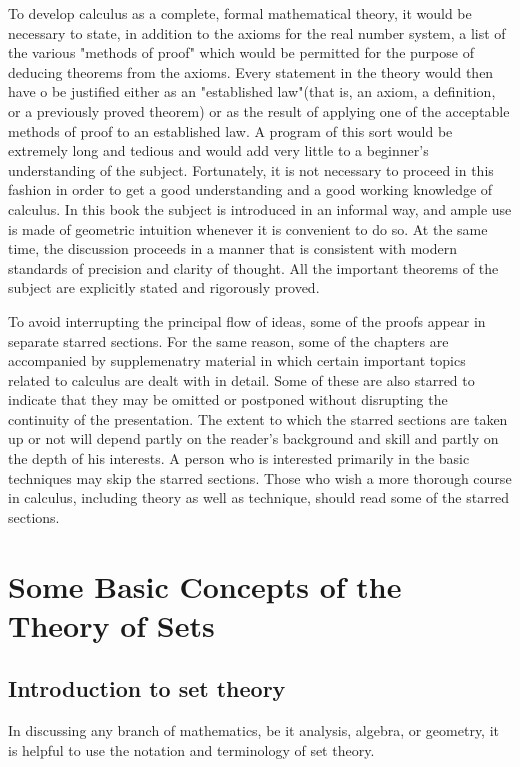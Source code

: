 \documentclass[cn,11pt,chinese]{elegantbook}
\numberwithin{equation}{section}
\begin{document}
To develop calculus as a complete, formal mathematical theory, it would be necessary to state, in addition to the axioms for the real number system, a list of the various "methods of proof" which would be permitted for the purpose of deducing theorems from the axioms. Every statement in the theory would then have o be justified either as an "established law"(that is, an axiom, a definition, or a previously proved theorem) or as the result of applying one of the acceptable methods of proof to an established law. A program of this sort would be extremely long and tedious and would add very little to a beginner's understanding of the subject. Fortunately, it is not necessary to proceed in this fashion in order to get a good understanding and a good working knowledge of calculus. In this book the subject is introduced in an informal way, and ample use is made of geometric intuition whenever it is convenient to do so. At the same time, the discussion proceeds in a manner that is consistent with modern standards of precision and clarity of thought. All the important theorems of the subject are explicitly stated and rigorously proved.

To avoid interrupting the principal flow of ideas, some of the proofs appear in separate starred sections. For the same reason, some of the chapters are accompanied by supplemenatry material in which certain important topics related to calculus are dealt with in detail. Some of these are also starred to indicate that they may be omitted or postponed without disrupting the continuity of the presentation. The extent to which the starred sections are taken up or not will depend partly on the reader's background and skill and partly on the depth of his interests. A person who is interested primarily in the basic techniques may skip the starred sections. Those who wish a more thorough course in calculus, including theory as well as technique, should read some of the starred sections.



\section{Some Basic Concepts of the Theory of Sets}\label{section00102}

\subsection{Introduction to set theory}
In discussing any branch of mathematics, be it analysis, algebra, or geometry, it is helpful to use the notation and terminology of set theory.
\end{document}
